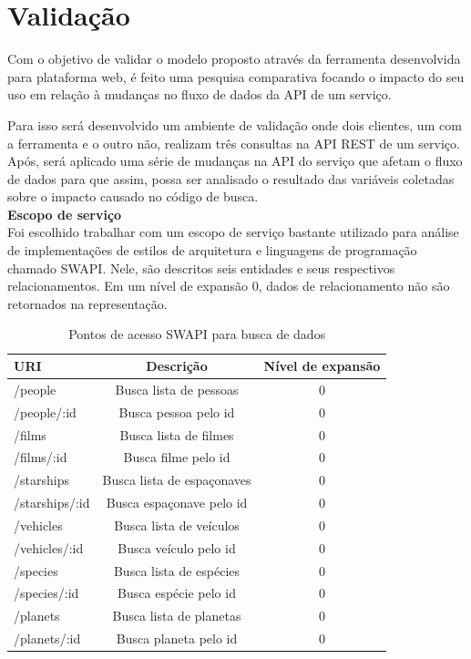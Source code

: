 \section{Validação}

Com o objetivo de validar o modelo proposto através da ferramenta desenvolvida para plataforma web, é feito uma pesquisa comparativa focando o impacto do seu uso em relação à mudanças no fluxo de dados da API de um serviço.

Para isso será desenvolvido um ambiente de validação onde dois clientes, um com a ferramenta e o outro não, realizam três consultas na API REST de um serviço. Após, será aplicado uma série de mudanças na API do serviço que afetam o fluxo de dados para que assim, possa ser analisado o resultado das variáveis coletadas sobre o impacto causado no código de busca. \\

\textbf{Escopo de serviço} \\

Foi escolhido trabalhar com um escopo de serviço bastante utilizado para análise de implementações de estilos de arquitetura e linguagens de programação chamado SWAPI. Nele, são descritos seis entidades e seus respectivos relacionamentos. Em um nível de expansão 0, dados de relacionamento não são retornados na representação.

\begin{table}[H]
  \centering
  \begin{tabular}{|l|c|c|}
    \hline
    URI & Descrição & Nível de expansão \\
    \hline
    /people & Busca lista de pessoas & 0 \\
    \hline
    /people/:id & Busca pessoa pelo id & 0 \\
    \hline
    /films & Busca lista de filmes & 0 \\
    \hline
    /films/:id & Busca filme pelo id & 0 \\
    \hline
    /starships & Busca lista de espaçonaves & 0 \\
    \hline
    /starships/:id & Busca espaçonave pelo id & 0 \\
    \hline
    /vehicles & Busca lista de veículos & 0 \\
    \hline
    /vehicles/:id & Busca veículo pelo id & 0 \\
    \hline
    /species & Busca lista de espécies & 0 \\
    \hline
    /species/:id & Busca espécie pelo id & 0 \\
    \hline
    /planets & Busca lista de planetas & 0 \\
    \hline
    /planets/:id & Busca planeta pelo id & 0 \\
    \hline
  \end{tabular}
  \caption{Pontos de acesso SWAPI para busca de dados}
\end{table}

